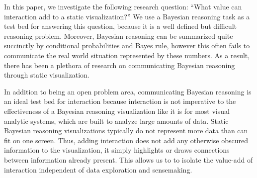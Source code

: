 In this paper, we investigate the following research question: ``What value can interaction add to a static visualization?'' We use a Bayesian reasoning task as a test bed for answering this question, because it is a well defined but difficult reasoning problem. 
Moreover, Bayesian reasoning can be summarized quite succinctly by conditional probabilities and Bayes rule, however this often fails to communicate the real world situation represented by these numbers. As a result, there has been a plethora of research on communicating Bayesian reasoning through static visualization\cite{brase2009Pictorial, garcia2013Visual, kellenFacilitating2007, ottley2012Visually, tsai2011Interactive, friederichs2014Using, sedlmeier2001Teaching, spiegelhalter2011Visualizing, gigerenzer1995How, cole1989Understanding, cole1989Graphic, khan2018Interactive, bocherer2019How, ottley2016Bayesian, micallef2012Assessing, khan2015Benefits}. %

In addition to being an open problem area, communicating Bayesian reasoning is an ideal test bed for interaction because interaction is not imperative to the effectiveness of a Bayesian reasoning visualization like it is for most visual analytic systems, which are built to analyze large amounts of data. Static Bayesian reasoning visualizations typically do not represent more data than can fit on one screen. Thus, adding interaction does not add any otherwise obscured information to the visualization, it simply highlights or draws connections between information already present. This allows us to to isolate the value-add of interaction independent of data exploration and sensemaking. 

